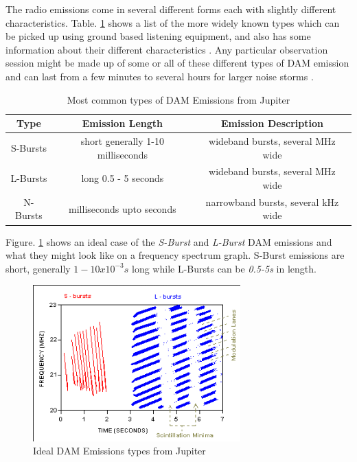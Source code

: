 \documentclass[runningheads,a4paper]{llncs}
\begin{document}
The radio emissions come in several different forms each with slightly different characteristics. Table. \ref{tab:dam_emissions} shows a list of the more widely known types which can be picked up using ground based listening equipment, and also has some information about their different characteristics \citep{wilkinson94}. Any particular observation session might be made up of some or all of these different types of \gls{DAM} emission and can last from a few minutes to several hours for larger noise storms \citep{wilkinson94}.

%
\begin{table}
  \centering
  \begin{tabular}[pos]{| c | c | c |}
    \hline
    Type & Emission Length & Emission Description\\ \hline
    S-Bursts & short generally 1-10 milliseconds & wideband bursts, several MHz wide\\ \hline
    L-Bursts & long 0.5 - 5 seconds & wideband bursts, several MHz wide\\ \hline
    N-Bursts & milliseconds upto seconds & narrowband bursts, several kHz wide\\
    \hline
  \end{tabular}
  \caption{Most common types of DAM Emissions from Jupiter \citep{wilkinson94}}
  \label{tab:dam_emissions}
\end{table}
%

Figure. \ref{fig:dam_emissions_spectrum} shows an ideal case of the \textit{S-Burst} and \textit{L-Burst} \gls{DAM} emissions and what they might look like on a frequency spectrum graph. S-Burst emissions are short, generally $1-10x10^{-3}s$ long while L-Bursts can be \textit{0.5-5s} in length.

%
\begin{figure}[here]
\centering
\includegraphics[width=8cm]{images/05}
\caption{Ideal DAM Emissions types from Jupiter \citep{wilkinson94}}
\label{fig:dam_emissions_spectrum}
\end{figure}
%
\end{document}
